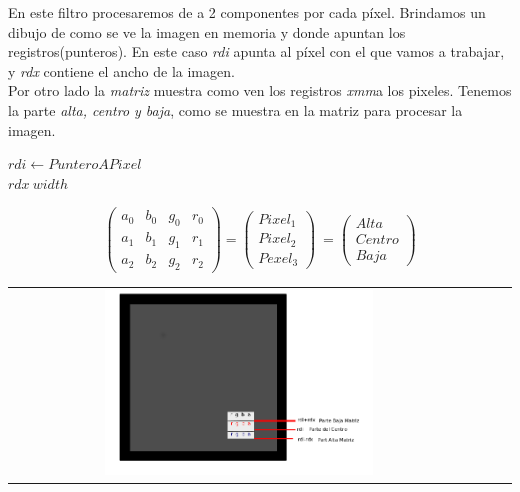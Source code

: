 \begin{multicols}{2}
En este filtro procesaremos de a 2 componentes por cada píxel.
Brindamos un dibujo de como se ve la imagen en memoria y donde apuntan los registros(punteros).
En este caso \emph{rdi} apunta al píxel con el que vamos a trabajar, y \emph{rdx} contiene el ancho de la imagen. \\
Por otro lado la \emph{matriz} muestra como ven los registros \emph{xmm}a los pixeles. Tenemos la parte  \emph{alta, centro y baja},
como se muestra en la matriz para procesar la imagen.
\begin{center}
		$rdi \gets PunteroAPixel$ \\
		$rdx \ width$
\end{center}

\begin{center}
\[ \left( \begin{array}{cccc}
 a_0 & b_0 & g_0 & r_0 \\ 
 a_1 & b_1 & g_1 & r_1 \\
 a_2 & b_2 & g_2 & r_2
\end{array} \right) = \left( \begin{array}{cccc}
 Pixel_1 \\ 
 Pixel_2 \\
 Pexel_3
\end{array} \right)\ = \left( \begin{array}{cccc}
 Alta \\ 
 Centro \\
 Baja
\end{array} \right)\] 

\end{center}



    \begin{center}
	    \begin{tabular}{cccc}
		  \includegraphics[width=0.6\textwidth]{imagenes/edge/edge1.png} \\
		\end{tabular}
	\end{center}


\end{multicols}



